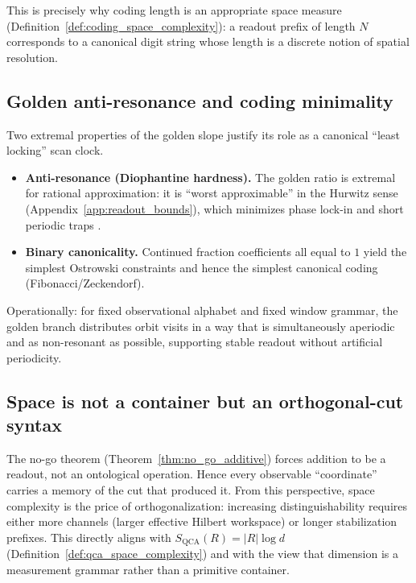 This is precisely why coding length is an appropriate space measure (Definition~\ref{def:coding_space_complexity}): a readout prefix of length $N$ corresponds to a canonical digit string whose length is a discrete notion of spatial resolution.

\subsection{Golden anti-resonance and coding minimality}
Two extremal properties of the golden slope justify its role as a canonical ``least locking'' scan clock.

\begin{itemize}
    \item \textbf{Anti-resonance (Diophantine hardness).} The golden ratio is extremal for rational approximation: it is ``worst approximable'' in the Hurwitz sense (Appendix~\ref{app:readout_bounds}), which minimizes phase lock-in and short periodic traps \cite{Cassels1957,KuipersNiederreiter1974}.
    \item \textbf{Binary canonicality.} Continued fraction coefficients all equal to $1$ yield the simplest Ostrowski constraints and hence the simplest canonical coding (Fibonacci/Zeckendorf).
\end{itemize}

Operationally: for fixed observational alphabet and fixed window grammar, the golden branch distributes orbit visits in a way that is simultaneously aperiodic and as non-resonant as possible, supporting stable readout without artificial periodicity.

\subsection{Space is not a container but an orthogonal-cut syntax}
The no-go theorem (Theorem~\ref{thm:no_go_additive}) forces addition to be a readout, not an ontological operation. Hence every observable ``coordinate'' carries a memory of the cut that produced it.
From this perspective, space complexity is the price of orthogonalization: increasing distinguishability requires either more channels (larger effective Hilbert workspace) or longer stabilization prefixes. This directly aligns with $S_{\mathrm{QCA}}(R)=|R|\log d$ (Definition~\ref{def:qca_space_complexity}) and with the view that dimension is a measurement grammar rather than a primitive container.
